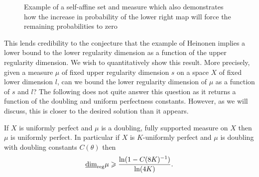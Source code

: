 \begin{figure}[h]
    \centering
    \caption{Example of a self-affine set and measure which also demonstrates how the increase in probability of the lower right map will force the remaining probabilities to zero}
    \label{fig:pathos-ex}
\end{figure}


This lends credibility to the conjecture that the example of Heinonen implies a lower bound to the lower regularity dimension as a function of the upper regularity dimension. We wish to quantitatively show this result. More precisely, given a measure $\mu$ of fixed upper regularity dimension $s$ on a space $X$ of fixed lower dimension $l$, can we bound the lower regularity dimension of $\mu$ as a function of $s$ and $l$? The following does not quite answer this question as it returns a function of the doubling and uniform perfectness constants. However, as we will discuss, this is closer to the desired solution than it appears.

\begin{proposition}\label{ch-quantifying:result-heinonen}
	If $X$ is uniformly perfect and $\mu$ is a doubling, fully supported measure on $X$ then $\mu$ is uniformly perfect. In particular if $X$ is $K$-uniformly perfect and $\mu$ is doubling with doubling constants $C(\theta)$ then  
	$$\underline{\dim}_{\textup{reg}} \mu \geqslant \frac{\ln(1-C(8K)^{-1})}{\ln(4K)} .$$  
\end{proposition}


